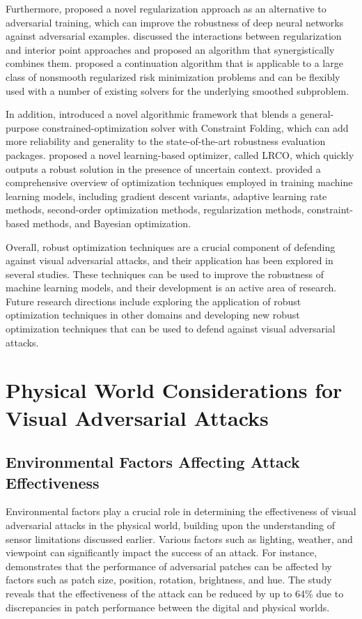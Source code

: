 \documentclass[11pt]{article}
\begin{document}
Furthermore, \cite{ref136} proposed a novel regularization approach as an alternative to adversarial training, which can improve the robustness of deep neural networks against adversarial examples. \cite{ref137} discussed the interactions between regularization and interior point approaches and proposed an algorithm that synergistically combines them. \cite{ref138} proposed a continuation algorithm that is applicable to a large class of nonsmooth regularized risk minimization problems and can be flexibly used with a number of existing solvers for the underlying smoothed subproblem.

In addition, \cite{ref131} introduced a novel algorithmic framework that blends a general-purpose constrained-optimization solver with Constraint Folding, which can add more reliability and generality to the state-of-the-art robustness evaluation packages. \cite{ref139} proposed a novel learning-based optimizer, called LRCO, which quickly outputs a robust solution in the presence of uncertain context. \cite{ref140} provided a comprehensive overview of optimization techniques employed in training machine learning models, including gradient descent variants, adaptive learning rate methods, second-order optimization methods, regularization methods, constraint-based methods, and Bayesian optimization.

Overall, robust optimization techniques are a crucial component of defending against visual adversarial attacks, and their application has been explored in several studies. These techniques can be used to improve the robustness of machine learning models, and their development is an active area of research. Future research directions include exploring the application of robust optimization techniques in other domains and developing new robust optimization techniques that can be used to defend against visual adversarial attacks.

\section{Physical World Considerations for Visual Adversarial Attacks}

\subsection{Environmental Factors Affecting Attack Effectiveness}

Environmental factors play a crucial role in determining the effectiveness of visual adversarial attacks in the physical world, building upon the understanding of sensor limitations discussed earlier. Various factors such as lighting, weather, and viewpoint can significantly impact the success of an attack. For instance, \cite{ref141} demonstrates that the performance of adversarial patches can be affected by factors such as patch size, position, rotation, brightness, and hue. The study reveals that the effectiveness of the attack can be reduced by up to 64\% due to discrepancies in patch performance between the digital and physical worlds.
\end{document}
